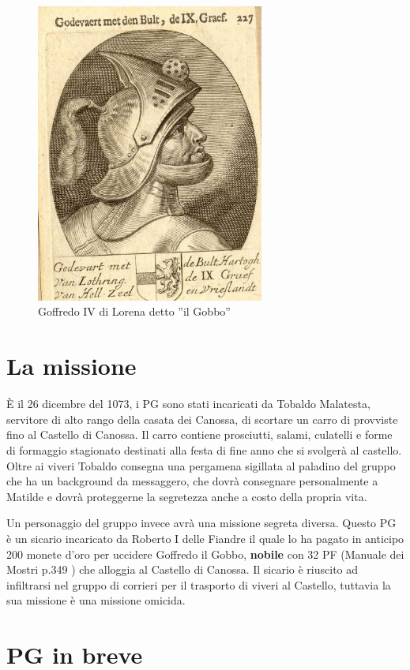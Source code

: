 \documentclass[letterpaper,twocolumn,openany,nodeprecatedcode]{dndbook}
\begin{document}
\begin{figure}
\centering
\includegraphics[width=7.5cm]{img/goffredo-il-gobbo.png}
    \caption{\textsf{Goffredo IV di Lorena detto ''il Gobbo''}}
    \label{fig:goffredo}
\end{figure}

\section{La missione}
È il 26 dicembre del 1073, i PG sono stati incaricati da Tobaldo Malatesta, servitore di alto rango della casata dei Canossa, di scortare un carro di provviste fino al Castello di Canossa. Il carro contiene prosciutti, salami, culatelli e forme di formaggio stagionato destinati alla festa di fine anno che si svolgerà al castello. Oltre ai viveri Tobaldo consegna una pergamena sigillata al paladino del gruppo che ha un background da messaggero, che dovrà consegnare personalmente a Matilde e dovrà proteggerne la segretezza anche a costo della propria vita.

Un personaggio del gruppo invece avrà una missione segreta diversa. Questo PG è un sicario incaricato da Roberto I delle Fiandre il quale lo ha pagato in anticipo 200 monete d'oro per uccidere Goffredo il Gobbo, \textbf{nobile} con 32 PF (Manuale dei Mostri p.349 \cite{dnd:mostri}) che alloggia al Castello di Canossa. Il sicario è riuscito ad infiltrarsi nel gruppo di corrieri per il trasporto di viveri al Castello, tuttavia la sua missione è una missione omicida.


\section{PG in breve}
\end{document}
